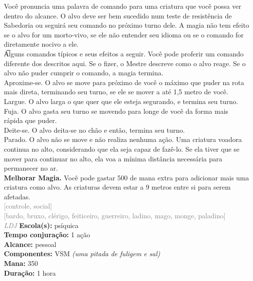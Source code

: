 \documentclass{RPG_Adventure}[2021/10/20]
\begin{document}
{\normalsize Você pronuncia uma palavra de comando para uma criatura que você possa ver dentro do alcance. O alvo deve ser bem sucedido num teste de resistência de Sabedoria ou seguirá seu comando no próximo turno dele. A magia não tem efeito se o alvo for um morto-vivo, se ele não entender seu idioma ou se o comando for diretamente nocivo a ele.\\\t Alguns comandos típicos e seus efeitos a seguir. Você pode proferir um comando diferente dos descritos aqui. Se o fizer, o Mestre descreve como o alvo reage. Se o alvo não puder cumprir o comando, a magia termina. \\\t \textit{}Aproxime-se.\textit{} O alvo se move para próximo de você o máximo que puder na rota mais direta, terminando seu turno, se ele se mover a até 1,5 metro de você.\\\t \textit{}Largue.\textit{} O alvo larga o que quer que ele esteja segurando, e termina seu turno.\\\t \textit{}Fuja.\textit{} O alvo gasta seu turno se movendo para longe de você da forma mais rápida que puder.\\\t \textit{}Deite-se.\textit{} O alvo deita-se no chão e então, termina seu turno.\\\t \textit{}Parado.\textit{} O alvo não se move e não realiza nenhuma ação. Uma criatura voadora continua no alto, considerando que ela seja capaz de fazê-lo. Se ela tiver que se mover para continuar no alto, ela voa a mínima distância necessária para permanecer no ar.\\\t \textbf{Melhorar Magia.} Você pode gastar 500 de mana extra para adicionar mais uma criatura como alvo. As criaturas devem estar a 9 metros entre si para serem afetadas.\\}
{\scriptsize \textcolor{gray}{[controle, social]\\}}
{\scriptsize \textcolor{gray}{[bardo, bruxo, clérigo, feiticeiro, guerreiro, ladino, mago, monge, paladino]\\}}
{\tiny \textcolor{gray}{\textit{LDJ}}}
{\small \t \textbf{Escola(s):} psíquica\\\t \textbf{Tempo conjuração:} 1 ação\\\t \textbf{Alcance:} pessoal\\\t \textbf{Componentes:} VSM \textit{(uma pitada de fuligem e sal)}\\\t \textbf{Mana:} 350\\\t \textbf{Duração:} 1 hora\\}
\end{document}
